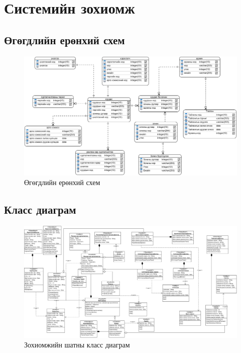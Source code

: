 
\chapter{Системийн зохиомж} %
\label{Chapter3} %

	\section{Өгөгдлийн ерөнхий схем}
		\begin{figure}[h!]
			\includegraphics[width=27cm,angle=90,scale=0.7]{Diagrams/Entity}
			\caption[Өгөгдлийн ерөнхий схем]{Өгөгдлийн ерөнхий схем}
			\label{text}
		\end{figure}

\section{Класс диаграм}
	\begin{figure}[!h]
		\includegraphics[angle=90,scale=0.34]{Diagrams/z_class}
		\caption[Зохиомжийн шатны класс диаграм]{Зохиомжийн шатны класс диаграм}
		\label{text}
	\end{figure}
